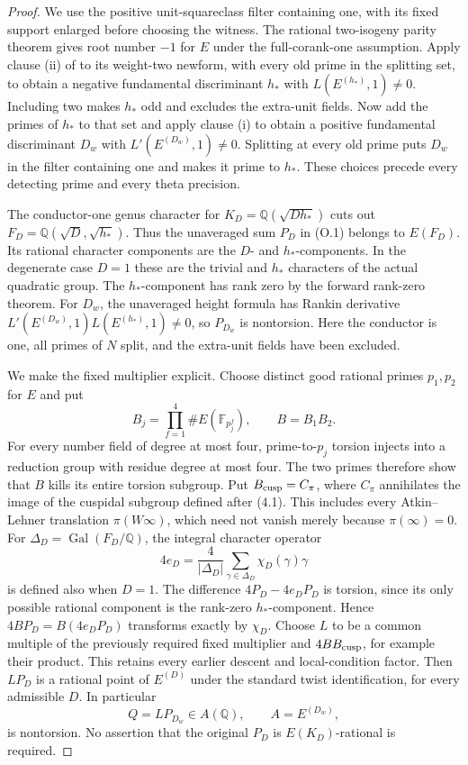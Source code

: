 \documentclass[11pt]{article}
\theoremstyle{definition}
\theoremstyle{remark}
\newcommand{\Q}{\mathbb Q}
\newcommand{\F}{\mathbb F}
\begin{document}
\begin{proof}\leavevmode
We use the positive unit-squareclass filter containing one, with its
fixed support enlarged before choosing the witness. The rational
two-isogeny parity theorem \cite[Theorem 1.8]{dd} gives root number
$-1$ for $E$ under the full-corank-one assumption. Apply clause (ii)
of \cite[pp.~543--544]{bfh} to its weight-two newform, with every
old prime in the splitting set, to obtain a negative fundamental
discriminant $h_*$ with $L(E^{(h_*)},1)\ne0$. Including two makes
$h_*$ odd and excludes the extra-unit fields. Now add the primes
of $h_*$ to that set and apply clause (i) to obtain a positive
fundamental discriminant $D_w$ with $L'(E^{(D_w)},1)\ne0$.
Splitting at every old prime puts $D_w$ in the filter containing one
and makes it prime to $h_*$. These choices precede every detecting
prime and every theta precision.

The conductor-one genus character for
$K_D=\Q(\sqrt{Dh_*})$ cuts out
$F_D=\Q(\sqrt D,\sqrt{h_*})$. Thus the unaveraged sum $P_D$ in (O.1)
belongs to $E(F_D)$. Its rational character components are the
$D$- and $h_*$-components. In the degenerate case $D=1$ these are
the trivial and $h_*$ characters of the actual quadratic group.
The $h_*$-component has rank zero by the forward rank-zero theorem.
For $D_w$, the unaveraged height formula
\cite[Theorem 1.1]{cst} has Rankin derivative
$L'(E^{(D_w)},1)L(E^{(h_*)},1)\ne0$, so $P_{D_w}$ is nontorsion.
Here the conductor is one, all primes of $N$ split, and the
extra-unit fields have been excluded.

We make the fixed multiplier explicit. Choose distinct good rational
primes $p_1,p_2$ for $E$ and put
\[
 B_j=\prod_{f=1}^{4}\#E(\F_{p_j^f}),\qquad B=B_1B_2.
\]
For every number field of degree at most four, prime-to-$p_j$
torsion injects into a reduction group with residue degree at most
four. The two primes therefore show that $B$ kills its entire
torsion subgroup. Put $B_{\rm cusp}=C_\pi$, where $C_\pi$
annihilates the image of the cuspidal subgroup defined after (4.1).
This includes every Atkin--Lehner translation $\pi(W\infty)$,
which need not vanish merely because $\pi(\infty)=0$. For $\Delta_D=\operatorname{Gal}(F_D/\Q)$,
the integral character operator
\[
 4e_D=\frac4{|\Delta_D|}
                  \sum_{\gamma\in\Delta_D}\chi_D(\gamma)\gamma
\]
is defined also when $D=1$. The difference
$4P_D-4e_DP_D$ is torsion, since its only possible rational
component is the rank-zero $h_*$-component. Hence
$4BP_D=B(4e_DP_D)$ transforms exactly by $\chi_D$.
Choose $L$ to be a common multiple of the previously required fixed
multiplier and $4BB_{\rm cusp}$, for example their product. This
retains every earlier descent and local-condition factor.
Then $LP_D$ is a rational point of
$E^{(D)}$ under the standard twist identification, for every
admissible $D$. In particular
\[
                         Q=LP_{D_w}\in A(\Q),
                 \qquad A=E^{(D_w)},
\]
is nontorsion. No assertion that the original $P_D$ is
$E(K_D)$-rational is required.


\end{proof}
\end{document}
